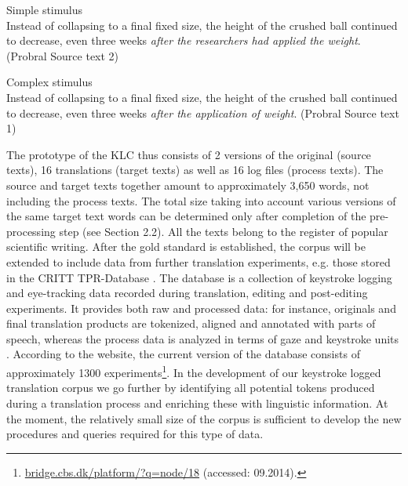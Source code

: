\documentclass[output=paper]{LSP/langsci}
\begin{document}
\ea \label{ex:1:1} Simple stimulus\\
Instead of collapsing to a final fixed size, the height of the crushed ball continued to decrease, even three weeks \emph{after the researchers had applied the weight}. (Probral Source text 2)
\z

\ea \label{ex:1:2}
Complex stimulus\\
Instead of collapsing to a final fixed size, the height of the crushed ball continued to decrease, even three weeks \emph{after the application of weight}. (Probral Source text 1)
\z

The prototype of the KLC thus consists of 2 versions of the original (source texts), 16 translations (target texts) as well as 16 log files (process texts). The source and target texts together amount to approximately 3,650 words, not including the process texts. The total size taking into account various versions of the same target text words can be determined only after completion of the pre-processing step (see Section 2.2). All the texts belong to the register of popular scientific writing. After the gold standard is established, the corpus will be extended to include data from further translation experiments, e.g. those stored in the CRITT TPR-Database \citep{Carl2012}. The database is a collection of keystroke logging and eye-tracking data recorded during translation, editing and post-editing experiments. It provides both raw and processed data: for instance, originals and final translation products are tokenized, aligned and annotated with parts of speech, whereas the process data is analyzed in terms of gaze and keystroke units \citep{Carl2012}. According to the website, the current version of the database consists of approximately 1300 experiments\footnote{\url{bridge.cbs.dk/platform/?q=node/18} (accessed: 09.2014).}. In the development of our keystroke logged translation corpus we go further by identifying all potential tokens produced during a translation process and enriching these with linguistic information. At the moment, the relatively small size of the corpus is sufficient to develop the new procedures and queries required for this type of data. 
\end{document}
